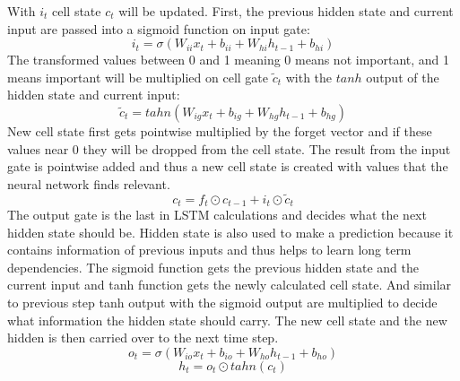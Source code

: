 With $i_t$ cell state $c_t$ will be updated. First, the previous hidden state and current input are passed into a sigmoid function on input gate:
\begin{equation}
i_t = \sigma (W_{ii}x_t + b_{ii} + W_{hi}h_{t-1} + b_{hi})
\end{equation}
The transformed values between 0 and 1 meaning 0 means not important, and 1 means important will be multiplied on cell gate $\tilde{c}_t$ with the $tanh$ output of the hidden state and current input:
\begin{equation}
\tilde{c}_t = tahn (W_{ig}x_t + b_{ig} + W_{hg}h_{t-1} + b_{hg})
\end{equation}
New cell state first gets pointwise multiplied by the forget vector and if these values near 0 they will be dropped from the cell state. The result from the input gate is pointwise added and thus a new cell state is created with values that the neural network finds relevant.
\begin{equation}
c_t = f_t \odot c_{t-1} + i_t \odot \tilde{c}_t
\end{equation}
The output gate is the last in LSTM calculations and decides what the next hidden state should be. Hidden state is also used to make a prediction because it contains information of previous inputs and thus helps to learn long term dependencies. The sigmoid function gets the previous hidden state and the current input and tanh function gets the newly calculated cell state. And similar to previous step tanh output with the sigmoid output are multiplied to decide what information the hidden state should carry. The new cell state and the new hidden is then carried over to the next time step.
\begin{equation}
o_t = \sigma (W_{io}x_t + b_{io} + W_{ho}h_{t-1} + b_{ho})
\end{equation}
\begin{equation}
h_t = o_t \odot tahn(c_t)
\end{equation}
